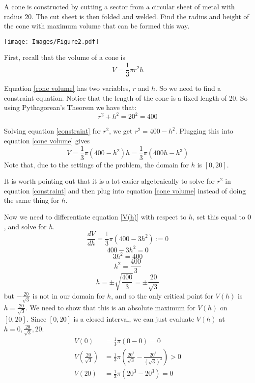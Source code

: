 \documentclass[handout,nooutcomes]{ximera}
\renewenvironment{freeResponse}{
\ifhandout\setbox0\vbox\bgroup\else
\begin{trivlist}\item[\hskip \labelsep\bfseries Solution:\hspace{2ex}]
\fi}
{\ifhandout\egroup\else
\end{trivlist}
\fi}
\newcommand{\dd}[2][]{\frac{d #1}{d #2}}
\begin{document}
\begin{problem}
  A cone is constructed by cutting a sector from a circular sheet of metal with radius 20.
  The cut sheet is then folded and welded.
  Find the radius and height of the cone with maximum volume that can be formed this way.

  \begin{image}
    \texttt{[image: Images/Figure2.pdf]}
  \end{image}
	
  \begin{freeResponse}
    First, recall that the volume of a cone is
    \begin{equation}
      \label{cone volume}
      V = \frac{1}{3} \pi r^2 h
    \end{equation}
		
    Equation \eqref{cone volume} has two variables, $r$ and $h$.  
    So we need to find a constraint equation.  
    Notice that the length of the cone is a fixed length of 20.  
    So using Pythagorean's Theorem we have that:
    \begin{equation}
      \label{constraint}
      r^2 + h^2 = 20^2 = 400
    \end{equation}
		
    Solving equation \eqref{constraint} for $r^2$, we get $r^2 = 400 - h^2$.  
    Plugging this into equation \eqref{cone volume} gives
    \begin{equation}
      \label{V(h)}
      V = \frac{1}{3} \pi (400-h^2) h = \frac{1}{3} \pi (400h - h^3) 
    \end{equation}
    Note that, due to the settings of the problem, the domain for $h$ is $[0,20]$.  
		
    It is worth pointing out that it is a lot easier algebraically to solve for $r^2$ in equation \eqref{constraint} and then plug into equation \eqref{cone volume} instead of doing the same thing for $h$.
		
    Now we need to differentiate equation \eqref{V(h)} with respect to $h$, set this equal to $0$, and solve for $h$.
    $$ \dd[V]{h} = \frac{1}{3} \pi (400 - 3h^2) := 0 $$
    $$ 400 - 3h^2 = 0 $$
    $$ 3h^2 = 400 $$
    $$ h^2 = \frac{400}{3} $$
    $$ h = \pm \sqrt{\frac{400}{3}} = \pm \frac{20}{\sqrt{3}} $$
    but $- \frac{20}{\sqrt{3}}$ is not in our domain for $h$, and so the only critical point for $V(h)$ is $h = \frac{20}{\sqrt{3}}$.  
    We need to show that this is an absolute maximum for $V(h)$ on $[0,20]$.  
    Since $[0,20]$ is a closed interval, we can just evaluate $V(h)$ at $h=0, \frac{20}{\sqrt{3}}, 20$.  
    \begin{align}
      V(0) &= \frac{1}{3} \pi (0-0) = 0 \\
      V \left( \frac{20}{\sqrt{3}} \right) &= \frac{1}{3} \pi \left( \frac{20^3}{\sqrt{3}} - \frac{20^3}{\left( \sqrt{3} \right)^3} \right) > 0 \label{inequality} \\
      V(20) &= \frac{1}{3} \pi (20^3 - 20^3) = 0 
    \end{align}
		

\end{freeResponse}
\end{problem}
\end{document}
